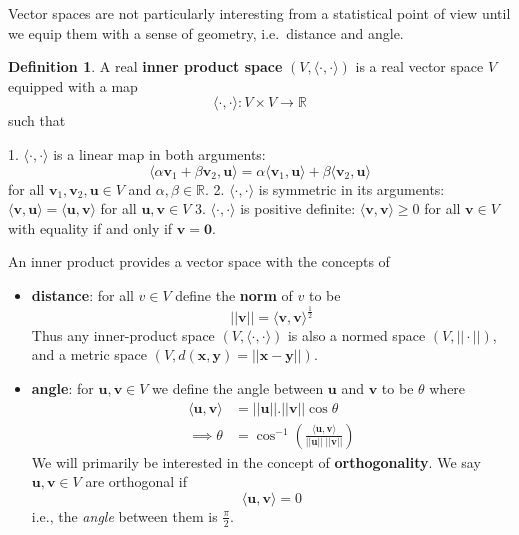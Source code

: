 \documentclass[]{book}
\theoremstyle{definition}
\newtheorem{definition}{Definition}[chapter]
\theoremstyle{definition}
\theoremstyle{definition}
\theoremstyle{remark}
\begin{document}
Vector spaces are not particularly interesting from a statistical point of view until we equip them with a sense of geometry, i.e.~distance and angle.

\begin{definition}
\protect\hypertarget{def:innerprod}{}{\label{def:innerprod} }A real \textbf{inner product space} \((V, \langle\cdot,\cdot\rangle)\) is a real vector space \(V\) equipped with a map
\[ \langle\cdot,\cdot\rangle : V \times V \rightarrow \mathbb{R}\]
such that
\end{definition}
1. \(\langle\cdot,\cdot\rangle\) is a linear map in both arguments:
\[\langle \alpha \boldsymbol v_1+\beta \boldsymbol v_2, \boldsymbol u\rangle = \alpha \langle \boldsymbol v_1, \boldsymbol u\rangle + \beta \langle \boldsymbol v_2, \boldsymbol u\rangle\]
for all \(\boldsymbol v_1, \boldsymbol v_2, \boldsymbol u\in V\) and \(\alpha, \beta \in \mathbb{R}\).
2. \(\langle\cdot,\cdot\rangle\) is symmetric in its arguments: \(\langle \boldsymbol v, \boldsymbol u\rangle = \langle \boldsymbol u, \boldsymbol v\rangle\) for all \(\boldsymbol u,\boldsymbol v\in V\)
3. \(\langle\cdot,\cdot\rangle\) is positive definite: \(\langle \boldsymbol v, \boldsymbol v\rangle \geq 0\) for all \(\boldsymbol v\in V\) with equality if and only if \(\boldsymbol v={\mathbf 0}\).

An inner product provides a vector space with the concepts of

\begin{itemize}
\item
  \textbf{distance}: for all \(v\in V\) define the \textbf{norm} of \(v\) to be \[||\boldsymbol v|| = \langle \boldsymbol v, \boldsymbol v\rangle ^{\frac{1}{2}}\]
  Thus any inner-product space \((V, \langle\cdot,\cdot\rangle)\) is also a normed space \((V, ||\cdot||)\), and a metric space \((V, d(\boldsymbol x,\boldsymbol y)=||\boldsymbol x-\boldsymbol y||)\).
\item
  \textbf{angle}: for \(\boldsymbol u, \boldsymbol v\in V\) we define the angle between \(\boldsymbol u\) and \(\boldsymbol v\) to be \(\theta\) where
  \begin{align*}
  \langle \boldsymbol u,\boldsymbol v\rangle &= ||\boldsymbol u||.||\boldsymbol v||\cos \theta\\
  \implies \theta &= \cos^{-1}\left( \frac{\langle \boldsymbol u, \boldsymbol v\rangle}{||\boldsymbol u|| \;||\boldsymbol v||}\right)
  \end{align*}
  We will primarily be interested in the concept of \textbf{orthogonality}. We say \(\boldsymbol u, \boldsymbol v\in V\) are orthogonal if
  \[\langle \boldsymbol u, \boldsymbol v\rangle =0\]
  i.e., the \emph{angle} between them is \(\frac{\pi}{2}\).
\end{itemize}
\end{document}
